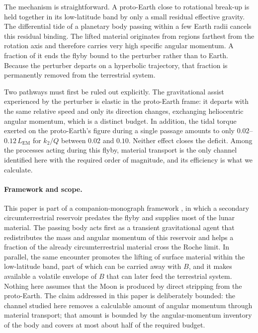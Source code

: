 \documentclass[11pt,a4paper]{article}
\begin{document}
The mechanism is straightforward. A proto-Earth close to rotational break-up is held together in its low-latitude band by only a small residual effective gravity. The differential tide of a planetary body passing within a few Earth radii cancels this residual binding. The lifted material originates from regions farthest from the rotation axis and therefore carries very high specific angular momentum. A fraction of it ends the flyby bound to the perturber rather than to Earth. Because the perturber departs on a hyperbolic trajectory, that fraction is permanently removed from the terrestrial system.

Two pathways must first be ruled out explicitly. The gravitational assist experienced by the perturber is elastic in the proto-Earth frame: it departs with the same relative speed and only its direction changes, exchanging heliocentric angular momentum, which is a distinct budget. In addition, the tidal torque exerted on the proto-Earth's figure during a single passage amounts to only $0.02$--$0.12\,L_{\mathrm{EM}}$ for $k_2/Q$ between $0.02$ and $0.10$. Neither effect closes the deficit. Among the processes acting during this flyby, material transport is the only channel identified here with the required order of magnitude, and its efficiency is what we calculate.

\paragraph{Framework and scope.}
This paper is part of a companion-monograph framework \cite{Debailleul2026}, in which a secondary circumterrestrial reservoir predates the flyby and supplies most of the lunar material. The passing body acts first as a transient gravitational agent that redistributes the mass and angular momentum of this reservoir and helps a fraction of the already circumterrestrial material cross the Roche limit. In parallel, the same encounter promotes the lifting of surface material within the low-latitude band, part of which can be carried away with $B$, and it makes available a volatile envelope of $B$ that can later feed the terrestrial system. Nothing here assumes that the Moon is produced by direct stripping from the proto-Earth. The claim addressed in this paper is deliberately bounded: the channel studied here removes a calculable amount of angular momentum through material transport; that amount is bounded by the angular-momentum inventory of the body and covers at most about half of the required budget.
\end{document}
